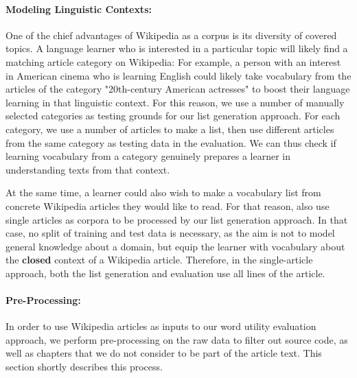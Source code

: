 \paragraph{Modeling Linguistic Contexts:}

One of the chief advantages of Wikipedia as a corpus is its diversity of covered topics.
A language learner who is interested in a particular topic will likely find a matching article category on Wikipedia:
For example, a person with an interest in American cinema who is learning English could likely take vocabulary from the articles of the category "20th-century American actresses" to boost their language learning in that linguistic context.
For this reason, we use a number of manually selected categories as testing grounds for our list generation approach.
For each category, we use a number of articles to make a list, then use different articles from the same category as testing data in the evaluation.
We can thus check if learning vocabulary from a category genuinely prepares a learner in understanding texts from that context.

At the same time, a learner could also wish to make a vocabulary list from concrete Wikipedia articles they would like to read.
For that reason, also use single articles as corpora to be processed by our list generation approach.
In that case, no split of training and test data is necessary, as the aim is not to model general knowledge about a domain, but equip the learner with vocabulary about the \textbf{closed} context of a Wikipedia article.
Therefore, in the single-article approach, both the list generation and evaluation use all lines of the article.




\paragraph{Pre-Processing:}
In order to use Wikipedia articles as inputs to our word utility evaluation approach, we perform pre-processing on the raw data to filter out source code, as well as chapters that we do not consider to be part of the article text.
This section shortly describes this process.

